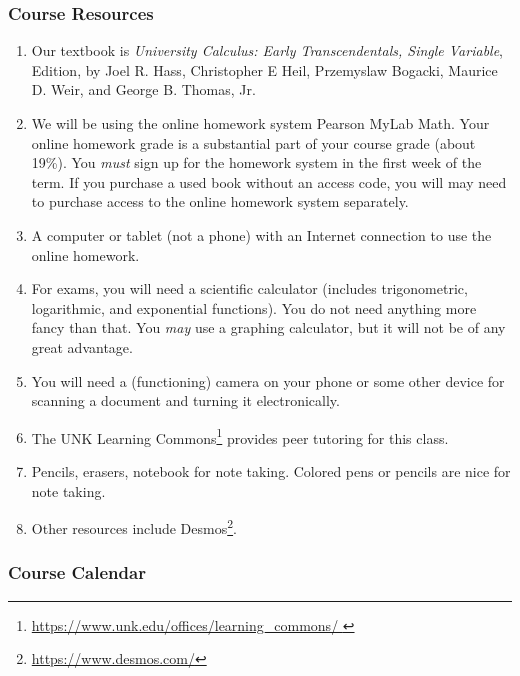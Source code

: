 \documentclass[12pt]{article}
\newcounter{ex}\setcounter{ex}{0}
\begin{document}
\subsubsection*{Course Resources}
\begin{enumerate}

    \item Our textbook is \emph{University Calculus: Early Transcendentals, Single Variable},   Edition, by Joel R. Hass, Christopher E Heil, Przemyslaw Bogacki,
    Maurice D. Weir,  and George B. Thomas, Jr.
    
    \item We will be using the online homework system Pearson MyLab Math. Your online homework grade is a 
    substantial part of your course grade (about 19\%). You \emph{must} sign up for the homework system in the first week of the term. If you purchase a used book without an access code, you will  may need to purchase access to the online homework system
    separately.
    
    \item A computer or tablet (not a phone) with an Internet connection to use the online homework.
    
    
    \item For exams, you will need a scientific calculator (includes trigonometric, logarithmic, 
    and exponential functions).  You do not need anything more fancy 
    than that. You \emph{may} use a graphing calculator, but it will not be of any great advantage.
    
    \item You will need a (functioning) camera on your phone or some 
    other device for scanning a document and turning it electronically. 
    
    \item The UNK Learning Commons\footnote{\url{https://www.unk.edu/offices/learning_commons/ }} provides peer tutoring for this class. 
        
    \item Pencils, erasers, notebook for note taking. Colored pens or pencils are nice for note taking.
    
     \item Other resources include Desmos\footnote{\url{https://www.desmos.com/}}.    
     \end{enumerate}



\subsubsection*{Course Calendar}
\end{document}
